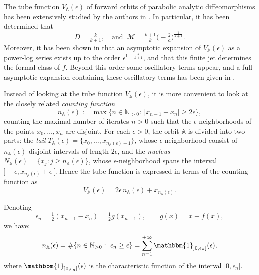 \documentclass[a4paper,11pt]{amsart}
\numberwithin{equation}{section}
\newcommand{\N}{{\mathbb N}}
\newcommand{\orbit}{\mathbb{A}}
\theoremstyle{definition}
\begin{document}
The tube function $V_\orbit(\epsilon)$ of forward orbits of parabolic analytic diffeomorphisms has been extensively studied by the authors in \cite{MRR,MRRZ1,Resman1,Resman2}.  
In particular, it has been determined \cite{EZZ,MRR} that 
\begin{equation}\label{eq:Minkowski}
	D=\tfrac{k}{k+1},\quad\text{and } \ \mathcal{M}=\tfrac{k+1}{k}\big(\!-\!\tfrac{2}{a}\big)^{\frac1{k+1}}.
\end{equation}
Moreover, it has been shown in \cite{Resman2} that an asymptotic expansion of $V_\orbit(\epsilon)$ as a power-log series exists up to the order $\epsilon^{1+\frac{k}{k+1}}$, and that this finite jet determines the formal class of $f$.
Beyond this order some oscillatory terms appear, and a full asymptotic expansion containing these oscillatory terms has been given in \cite{MRR}.


Instead of looking at the tube function $V_\orbit(\epsilon)$, it is more convenient to look at the closely related \emph{counting function}
\[n_\orbit(\epsilon):=\max\{n\in\N_{>0}:\ |x_{n-1}-x_n|\geq2\epsilon\},\]
counting the maximal number of iterates $n>0$ such that the $\epsilon$-neighborhoods of the points $x_0,\ldots,x_{n}$ are disjoint.
For each $\epsilon>0$, the orbit $\orbit$ is divided into two parts: 
the \emph{tail} $T_\orbit(\epsilon)=\{x_0,\ldots,x_{n_\orbit(\epsilon)-1}\}$,  whose $\epsilon$-neighborhood consist of $n_\orbit(\epsilon)$ disjoint intervals of length $2\epsilon$, and
the \emph{nucleus} $N_\orbit(\epsilon)=\{x_j: j\geq n_\orbit(\epsilon)\}$, whose $\epsilon$-neighborhood spans the interval $]-\epsilon,x_{n_\orbit(\epsilon)}+\epsilon\,[$.
Hence the tube function is expressed in terms of the counting function as
\begin{equation}\label{eq:VA}
	V_\orbit(\epsilon)=2\epsilon\, n_\orbit(\epsilon)+x_{n_\orbit(\epsilon)}.
\end{equation}

Denoting
\begin{equation}\label{eq:eps}\epsilon_n=\tfrac12(x_{n-1}-x_n)=\tfrac12 g(x_{n-1}),\qquad g(x)=x-f(x),\end{equation}
we have:
\[n_\orbit(\epsilon)=\# \{n\in\N_{>0}:\ \epsilon_n\geq\epsilon\}=\sum_{n=1}^{+\infty}\mathbbm{1}_{]0,\epsilon_n]}(\epsilon),\]
where $\mathbbm{1}_{]0,\epsilon_n]}(\epsilon)$ is the characteristic function of the interval $]0,\epsilon_n]$.
\end{document}
